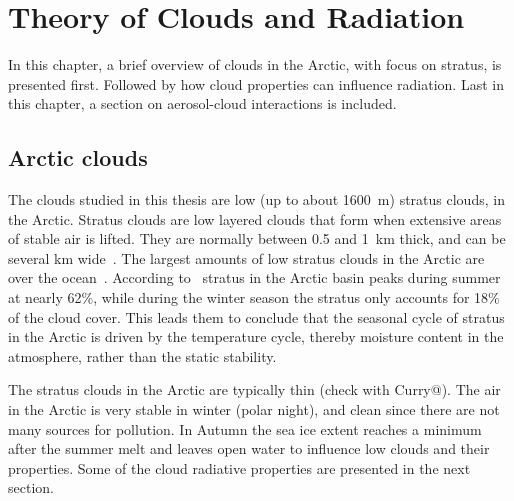 \chapter{Theory of Clouds and Radiation}%
\label{chap:theory}
In this chapter, a brief overview of clouds in the Arctic, with focus on stratus, is presented first. Followed by how cloud properties can influence radiation. Last in this chapter, a section on aerosol-cloud interactions is included.


\section{Arctic clouds}%
The clouds studied in this thesis are low (up to about 1600~m) stratus clouds, in the Arctic. Stratus clouds are low layered clouds that form when extensive areas of stable air is lifted. They are normally between 0.5 and 1~km thick, and can be several km wide~\citep{Aguado2010}. The largest amounts of low stratus clouds in the Arctic are over the ocean~\citep{Klein1993}.
According to~\citet{Klein1993} stratus in the Arctic basin peaks during summer at nearly 62\%, while during the winter season the stratus only accounts for 18\% of the cloud cover. This leads them to conclude that the seasonal cycle of stratus in the Arctic is driven by the temperature cycle, thereby moisture content in the atmosphere, rather than the static stability.

The stratus clouds in the Arctic are typically thin (check with Curry@).
The air in the Arctic is very stable in winter (polar night), and clean since there are not many sources for pollution. In Autumn the sea ice extent reaches a minimum after the summer melt and leaves open water to influence low clouds and their properties. Some of the cloud radiative properties  are presented in the next section.

